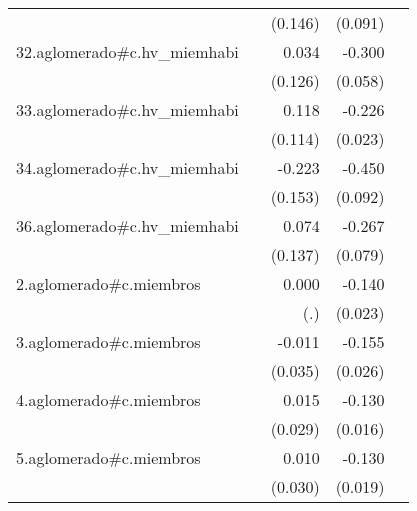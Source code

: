 {\begin{longtable}{l*{4}{D{.}{.}{-1}}}
            &                     &     (0.146)         &     (0.091)         &                     \\
\addlinespace
32.aglomerado#c.hv\_miemhabi&                     &       0.034         &      -0.300\sym{***}&                     \\
            &                     &     (0.126)         &     (0.058)         &                     \\
\addlinespace
33.aglomerado#c.hv\_miemhabi&                     &       0.118         &      -0.226\sym{***}&                     \\
            &                     &     (0.114)         &     (0.023)         &                     \\
\addlinespace
34.aglomerado#c.hv\_miemhabi&                     &      -0.223         &      -0.450\sym{***}&                     \\
            &                     &     (0.153)         &     (0.092)         &                     \\
\addlinespace
36.aglomerado#c.hv\_miemhabi&                     &       0.074         &      -0.267\sym{***}&                     \\
            &                     &     (0.137)         &     (0.079)         &                     \\
\addlinespace
2.aglomerado#c.miembros&                     &       0.000         &      -0.140\sym{***}&                     \\
            &                     &         (.)         &     (0.023)         &                     \\
\addlinespace
3.aglomerado#c.miembros&                     &      -0.011         &      -0.155\sym{***}&                     \\
            &                     &     (0.035)         &     (0.026)         &                     \\
\addlinespace
4.aglomerado#c.miembros&                     &       0.015         &      -0.130\sym{***}&                     \\
            &                     &     (0.029)         &     (0.016)         &                     \\
\addlinespace
5.aglomerado#c.miembros&                     &       0.010         &      -0.130\sym{***}&                     \\
            &                     &     (0.030)         &     (0.019)         &                     \\

\end{longtable}}
